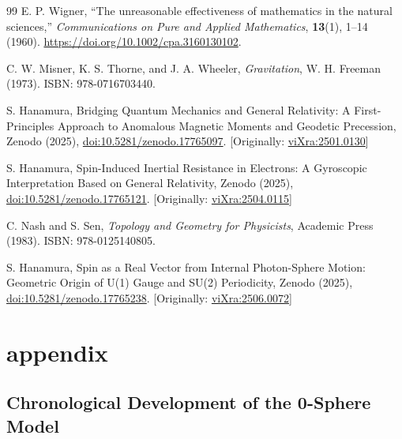 \documentclass[%
 reprint,
 amsmath,amssymb,
 aps,
]{revtex4-1}
\numberwithin{equation}{section}%
\begin{document}
\begin{thebibliography}{99}
E. P. Wigner, ``The unreasonable effectiveness of mathematics in the natural sciences,'' \textit{Communications on Pure and Applied Mathematics}, \textbf{13}(1), 1--14 (1960). \href{https://doi.org/10.1002/cpa.3160130102}{https://doi.org/10.1002/cpa.3160130102}.

C. W. Misner, K. S. Thorne, and J. A. Wheeler, \textit{Gravitation}, W. H. Freeman (1973). ISBN: 978-0716703440.

S. Hanamura, Bridging Quantum Mechanics and General Relativity: A First-Principles Approach to Anomalous Magnetic Moments and Geodetic Precession, Zenodo (2025), \href{https://doi.org/10.5281/zenodo.17765097}{doi:10.5281/zenodo.17765097}. [Originally: \href{https://vixra.org/abs/2501.0130}{viXra:2501.0130}]

S. Hanamura, Spin-Induced Inertial Resistance in Electrons: A Gyroscopic Interpretation Based on General Relativity, Zenodo (2025), \href{https://doi.org/10.5281/zenodo.17765121}{doi:10.5281/zenodo.17765121}. [Originally: \href{https://vixra.org/abs/2504.0115}{viXra:2504.0115}]

C. Nash and S. Sen, \textit{Topology and Geometry for Physicists}, Academic Press (1983). ISBN: 978-0125140805.

S. Hanamura, Spin as a Real Vector from Internal Photon-Sphere Motion: Geometric Origin of U(1) Gauge and SU(2) Periodicity, Zenodo (2025), \href{https://doi.org/10.5281/zenodo.17765238}{doi:10.5281/zenodo.17765238}. [Originally: \href{https://vixra.org/abs/2506.0072}{viXra:2506.0072}]

\end{thebibliography}

\section{appendix}

\subsection{Chronological Development of the 0-Sphere Model}
\end{document}
